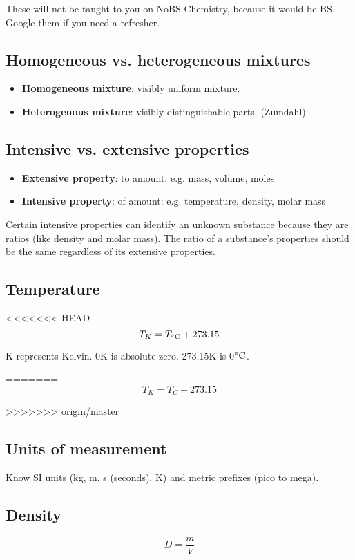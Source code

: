 \documentclass[letterpaper, 12pt]{article}
\begin{document}
These will not be taught to you on NoBS Chemistry, because it would be BS. Google them if you need a refresher.

	\subsection{Homogeneous vs. heterogeneous mixtures}
	\begin{itemize}
		\item \textbf{Homogeneous mixture}: visibly uniform mixture.
		\item \textbf{Heterogenous mixture}: visibly distinguishable parts. (Zumdahl)
	\end{itemize}

	\subsection{Intensive vs. extensive properties}
	\begin{itemize}
		\item \textbf{Extensive property}:  to amount: e.g. mass, volume, moles
		\item \textbf{Intensive property}:  of amount: e.g. temperature, density, molar mass
	\end{itemize}

	Certain intensive properties can identify an unknown substance because they are ratios (like density and molar mass). The ratio of a substance's properties should be the same regardless of its extensive properties.

	\subsection{Temperature}
<<<<<<< HEAD
	$$T_{K} = T_{^{\circ}{\rm C}} + 273.15$$
	
	K represents Kelvin. 0K is absolute zero. 273.15K is 0$^{\circ}{\rm C}$.
	
=======
	$$T_{K} = T_{C} + 273.15$$

>>>>>>> origin/master
	\subsection{Units of measurement}
	Know SI units (kg, m, s (seconds), K) and metric prefixes (pico to mega).

	\subsection{Density}
	$$D = \frac{m}{V}$$
\end{document}
